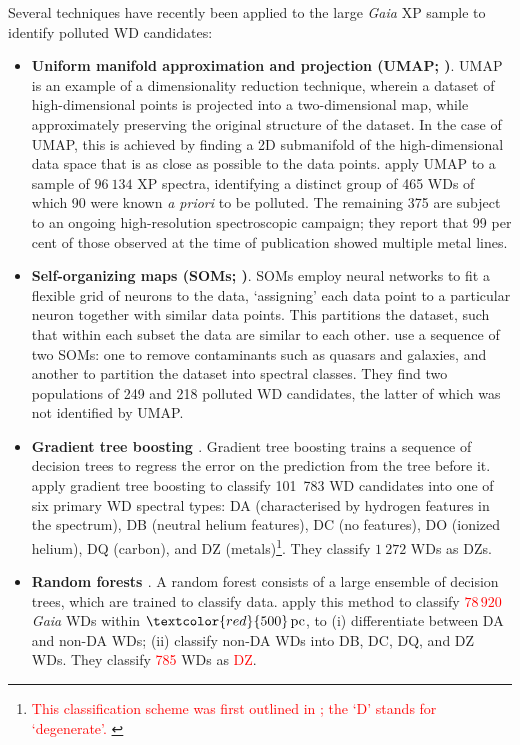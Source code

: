 \documentclass[fleqn,usenatbib]{rasti}
\newcommand{\red}[1]{\textcolor{red}{#1}}
\begin{document}
Several techniques have recently been applied to the large \textit{Gaia} XP sample to identify polluted WD candidates:
\begin{itemize}
\item \textbf{Uniform manifold approximation and projection (UMAP; \citealt{mcinnes18})}.
UMAP is an example of a dimensionality reduction technique, wherein a dataset of high-dimensional points is projected into a two-dimensional map, while approximately preserving the original structure of the dataset.
In the case of UMAP, this is achieved by finding a 2D submanifold of the high-dimensional data space that is as close as possible to the data points. 
\citet{kao24} apply UMAP to a sample of $96~134$ XP spectra, identifying a distinct group of 465 WDs of which 90 were known \textit{a priori} to be polluted.
The remaining 375 are subject to an ongoing high-resolution spectroscopic campaign; they report that 99 per cent of those observed at the time of publication showed multiple metal lines.
\item \textbf{Self-organizing maps (SOMs; \citealt{kohonen82})}.
SOMs employ neural networks to fit a flexible grid of neurons to the data, `assigning' each data point to a particular neuron together with similar data points.
This partitions the dataset, such that within each subset the data are similar to each other.
\citet{perezcouto24} use a sequence of two SOMs: one to remove contaminants such as quasars and galaxies, and another to partition the dataset into spectral classes.
They find two populations of 249 and 218 polluted WD candidates, the latter of which was not identified by UMAP.
\item \textbf{Gradient tree boosting \citep{friedman01}}.
Gradient tree boosting trains a sequence of decision trees to regress the error on the prediction from the tree before it.
\citet{vincent24} apply gradient tree boosting to classify 101~783 WD candidates into one of six primary WD spectral types:
DA (characterised by hydrogen features in the spectrum),
DB (neutral helium features),
DC (no features),
DO (ionized helium),
DQ (carbon),
and DZ (metals)\footnote{
    \red{
        This classification scheme was first outlined in \citet{sion83}; the `D' stands for `degenerate'.
    }
}.
They classify $1~272$ WDs as DZs.
\item \textbf{Random forests \citep{breiman01}}.
A random forest consists of a large ensemble of decision trees, which are trained to classify data.
\red{\citet{garciazamora25}} apply this method to classify \red{$78\,920$}
\textit{Gaia} WDs within $\red{500}\,\text{pc}$, to (i) differentiate between DA and non-DA WDs; (ii) classify non-DA WDs into DB, DC, DQ, and DZ WDs.
They classify \red{785} WDs as \red{DZ}.
\end{itemize}
\end{document}
